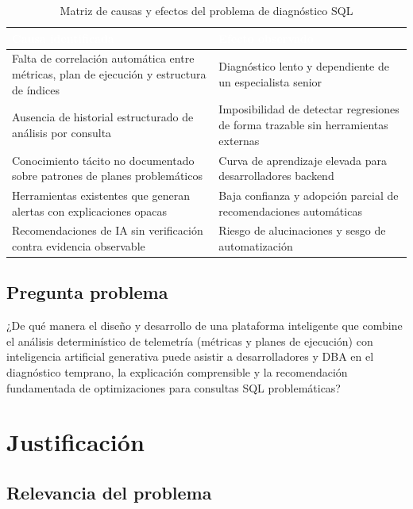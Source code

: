 \documentclass[12pt,a4paper]{article}
\begin{document}
\begingroup
{}
\begin{table}[H]
\centering
\small
\begin{tabularx}{\textwidth}{p{} X}
\toprule
\rowcolor{utbblue}
\textcolor{white}{\textbf{Causa identificada}} & \textcolor{white}{\textbf{Efecto observado}} \\
\midrule
Falta de correlación automática entre métricas, plan de ejecución y estructura de índices & Diagnóstico lento y dependiente de un especialista senior \\
Ausencia de historial estructurado de análisis por consulta & Imposibilidad de detectar regresiones de forma trazable sin herramientas externas \\
Conocimiento tácito no documentado sobre patrones de planes problemáticos & Curva de aprendizaje elevada para desarrolladores backend \\
Herramientas existentes que generan alertas con explicaciones opacas & Baja confianza y adopción parcial de recomendaciones automáticas \\
Recomendaciones de IA sin verificación contra evidencia observable & Riesgo de alucinaciones y sesgo de automatización \cite{parasuraman-bias} \\
\bottomrule
\end{tabularx}
\caption{Matriz de causas y efectos del problema de diagnóstico SQL}
\label{tab:causas-efectos}
\end{table}
\endgroup

\subsection{Pregunta problema}

¿De qué manera el diseño y desarrollo de una plataforma inteligente que combine el análisis determinístico de telemetría (métricas y planes de ejecución) con inteligencia artificial generativa puede asistir a desarrolladores y DBA en el diagnóstico temprano, la explicación comprensible y la recomendación fundamentada de optimizaciones para consultas SQL problemáticas?

\section{Justificación}

\subsection{Relevancia del problema}
\end{document}
